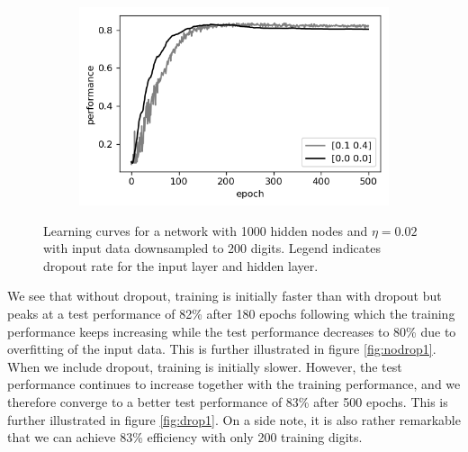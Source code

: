\documentclass{article}
\begin{document}
\begin{figure}[h]
	\centering
	\begin{subfigure}[t]{0.62\linewidth}
		\centering
		\includegraphics[width = 1.0\linewidth, trim={0 0 0 0}, clip=true]{figures/dropout_N1000_eta02.png}
	\end{subfigure}%
\caption{Learning curves for a network with 1000 hidden nodes and $\eta=0.02$ with input data downsampled to 200 digits. Legend indicates dropout rate for the input layer and hidden layer.}
\label{fig:dropout}
\end{figure}

\newpage

We see that without dropout, training is initially faster than with dropout but peaks at a test performance of 82\% after 180 epochs following which the training performance keeps increasing while the test performance decreases to 80\% due to overfitting of the input data. This is further illustrated in figure \ref{fig:nodrop1}. When we include dropout, training is initially slower. However, the test performance continues to increase together with the training performance, and we therefore converge to a better test performance of 83\% after 500 epochs. This is further illustrated in figure \ref{fig:drop1}. On a side note, it is also rather remarkable that we can achieve 83\% efficiency with only 200 training digits.
\end{document}
